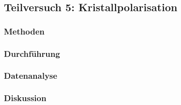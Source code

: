 \subsection{Teilversuch 5: Kristallpolarisation}

	\subsubsection*{Methoden}
		
		
	\subsubsection*{Durchführung}
	
	
	\subsubsection*{Datenanalyse}
		
	
	\subsubsection*{Diskussion}
	
